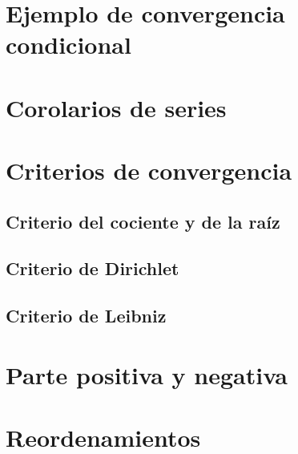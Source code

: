 \section{Ejemplo de convergencia condicional}

\section{Corolarios de series}

\section{Criterios de convergencia}

\subsection{Criterio del cociente y de la raíz}

\subsection{Criterio de Dirichlet}

\subsection{Criterio de Leibniz}

\section{Parte positiva y negativa}

\section{Reordenamientos}

